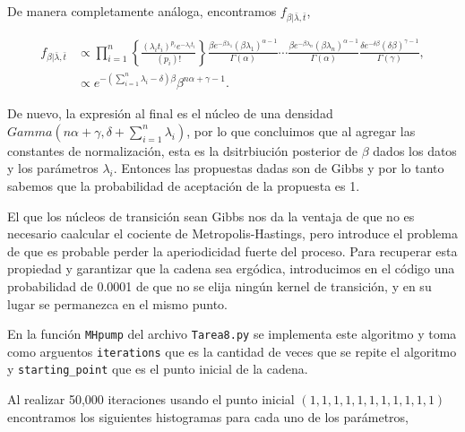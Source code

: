 \documentclass{article}
\begin{document}
\begin{enumerate}
    De manera completamente análoga, encontramos $f_{\beta|\bar\lambda,\bar t}$,

    \begin{align*}
        f_{\beta|\bar\lambda,\bar t} 
        &\propto \prod_{i=1}^n \left\{ \frac{ (\lambda_i t_i)^{p_i} e^{-\lambda_i t_i} }{(p_i)!}\right\}
        \frac{\beta e^{-\beta\lambda_1}(\beta\lambda_1)^{\alpha-1}}{\Gamma(\alpha)} \cdots
        \frac{\beta e^{-\beta\lambda_n}(\beta\lambda_n)^{\alpha-1}}{\Gamma(\alpha)}
        \frac{\delta e^{-\delta\beta}(\delta\beta)^{\gamma-1}}{\Gamma(\gamma)},\\
        &\propto e^{-\left(\sum_{i=1}^n\lambda_i -\delta\right)\beta} \beta^{n\alpha+\gamma-1}.
    \end{align*}

    De nuevo, la expresión al final es el núcleo de una densidad $Gamma\left(n\alpha+\gamma
    , \delta + \sum_{i=1}^n \lambda_i \right)$, por lo que concluimos que al agregar las
    constantes de normalización, esta es la dsitrbiución posterior de $\beta$ dados los
    datos y los parámetros $\lambda_i$. Entonces las propuestas dadas son de Gibbs y por
    lo tanto sabemos que la probabilidad de aceptación de la propuesta es 1.

    El que los núcleos de transición sean Gibbs nos da la ventaja de que no es necesario 
    caalcular el cociente de Metropolis-Hastings, pero introduce el problema de que es
    probable perder la aperiodicidad fuerte del proceso. Para recuperar esta propiedad
    y garantizar que la cadena sea ergódica, introducimos en el código una probabilidad
    de 0.0001 de que no se elija ningún kernel de transición, y en su lugar se permanezca
    en el mismo punto.

    En la función \texttt{MHpump} del archivo \texttt{Tarea8.py} se implementa este 
    algoritmo y toma como arguentos \texttt{iterations} que es la cantidad de veces
    que se repite el algoritmo y \texttt{starting\_point} que es el punto inicial de
    la cadena. 
    
    Al realizar 50,000 iteraciones usando el punto inicial $(1,1,1,1,1,1,1,1,1,1,1)$
    encontramos los siguientes histogramas para cada uno de los parámetros,


\end{enumerate}
\end{document}
